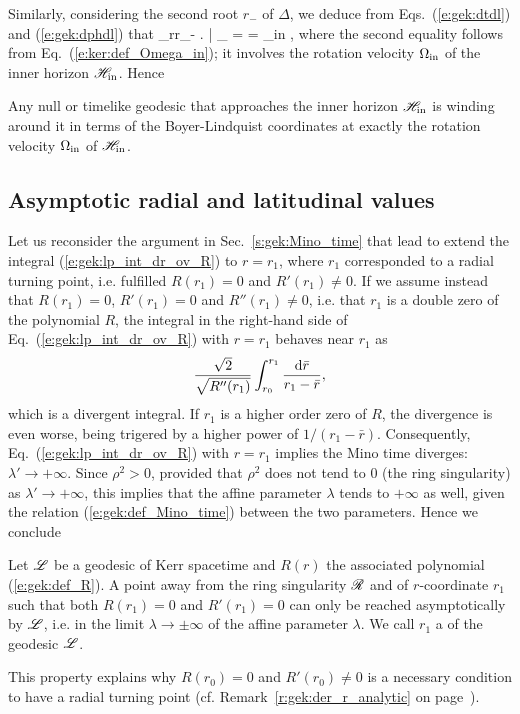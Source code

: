 Similarly, considering the second root $r_-$ of $\Delta$, we deduce
from
Eqs.~(\ref{e:gek:dtdl}) and
(\ref{e:gek:dphdl}) that
\be
    \lim_{r\to r_-} \left.  \right| _{\Li} =  = \Omega_{\rm in} ,
\ee
where the second equality follows from Eq.~(\ref{e:ker:def_Omega_in}); it involves
the rotation velocity $\Omega_{\rm in}$ of the inner horizon $\mathscr{H}_{\rm in}$.
Hence
\begin{greybox}
Any null or timelike geodesic that approaches the inner horizon $\mathscr{H}_{\rm in}$
is winding around it in terms of the Boyer-Lindquist coordinates at exactly the
rotation velocity $\Omega_{\rm in}$ of $\mathscr{H}_{\rm in}$.
\end{greybox}

\subsection{Asymptotic radial and latitudinal values} \label{s:gek:asymptotic_values}

Let us reconsider the argument in Sec.~\ref{s:gek:Mino_time}
that lead to extend the integral
(\ref{e:gek:lp_int_dr_ov_R}) to $r=r_1$, where $r_1$ corresponded to
a radial turning point, i.e. fulfilled $R(r_1)=0$ and $R'(r_1)\neq 0$.
If we assume instead that $R(r_1)=0$, $R'(r_1)=0$ and
$R''(r_1)\neq 0$, i.e. that $r_1$ is a double zero of the polynomial $R$,
the integral in the right-hand side of Eq.~(\ref{e:gek:lp_int_dr_ov_R}) with $r=r_1$ behaves
near $r_1$ as
\[
    \frac{\sqrt{2}}{\sqrt{R''(r_1)}} \int_{r_0}^{r_1} \frac{\mathrm{d} \bar{r}}{r_1 - \bar{r}} ,
\]
which is a divergent integral. If $r_1$ is a higher order zero of $R$,
the divergence is even worse, being trigered by a higher power of $1/(r_1 - \bar{r})$.
Consequently, Eq.~(\ref{e:gek:lp_int_dr_ov_R}) with $r=r_1$
implies the Mino time diverges: $\lambda'\to +\infty$. Since $\rho^2 > 0$,
provided that $\rho^2$
does not tend to $0$ (the ring singularity) as $\lambda'\to +\infty$, this
implies that the affine parameter $\lambda$ tends to $+\infty$ as well, given
the relation (\ref{e:gek:def_Mino_time}) between the two parameters.
Hence we conclude
\begin{greybox}
Let $\mathscr{L}$ be a geodesic of Kerr spacetime and $R(r)$ the associated polynomial
(\ref{e:gek:def_R}).
A point away from the ring singularity $\mathscr{R}$ and of $r$-coordinate $r_1$
such that both $R(r_1) = 0$ and $R'(r_1) = 0$
can only be reached asymptotically by $\mathscr{L}$, i.e. in the limit
$\lambda\to \pm\infty$ of the affine parameter
$\lambda$. We call $r_1$ a  of the geodesic $\mathscr{L}$.
\end{greybox}
This property explains why $R(r_0) = 0$ and $R'(r_0) \neq 0$ is a necessary condition
to have a radial turning point (cf. Remark~\ref{r:gek:der_r_analytic} on page~\pageref{r:gek:der_r_analytic}).

